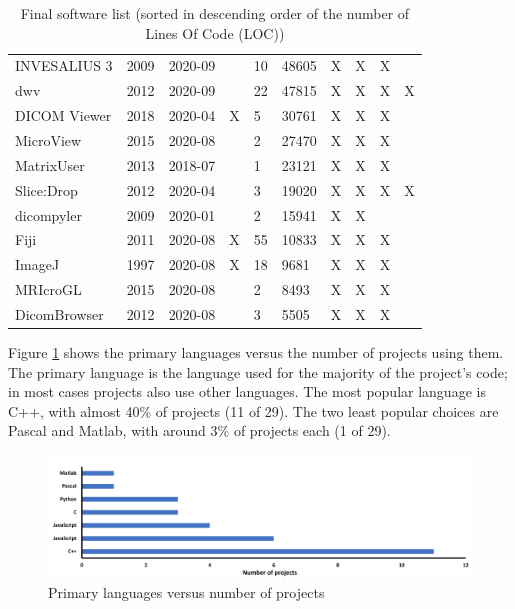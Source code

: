 \documentclass[final, 3p, times, authoryear]{elsarticle}
\begin{document}
\begin{table}[!ht]
\begin{tabular}{p{6cm}lllllllll}
INVESALIUS 3 \citep{Amorim2015} & 2009 & 2020-09 &  & 10 & 48605 & X & X & X &  \\
dwv \citep{Martelli2021} & 2012 & 2020-09 &  & 22 & 47815 & X & X & X & X \\
DICOM Viewer \citep{Afsar2021} & 2018 & 2020-04 & X & 5 & 30761 & X & X & X &  \\
MicroView \citep{ParallaxInnovations2020} & 2015 & 2020-08 &  & 2 & 27470 & X & X & X &  \\
MatrixUser \citep{Liu2016} & 2013 & 2018-07 &  & 1 & 23121 & X & X & X &  \\
Slice:Drop \citep{Haehn2013} & 2012 & 2020-04 &  & 3 & 19020 & X & X & X & X \\
dicompyler \citep{Panchal2010} & 2009 & 2020-01 &  & 2 & 15941 & X & X &  &  \\
Fiji \citep{Schindelin2012} & 2011 & 2020-08 & X & 55 & 10833 & X & X & X &  \\
ImageJ \citep{Rueden2017} & 1997 & 2020-08 & X & 18 & 9681 & X & X & X &  \\
MRIcroGL \citep{Rorden2021} & 2015 & 2020-08 &  & 2 & 8493 & X & X & X &  \\
DicomBrowser \citep{Archie2012} & 2012 & 2020-08 &  & 3 & 5505 & X & X & X &  \\ \bottomrule
\end{tabular}
\caption{Final software list (sorted in descending order of the number of Lines
Of Code (LOC))}
\label{tab_final_list}
\end{table}

Figure \ref{fig_language} shows the primary languages versus the number of
projects using them.  The primary language is the language used for the majority
of the project's code; in most cases projects also use other languages.  The
most popular language is C++, with almost 40\% of projects (11 of 29).  The two
least popular choices are Pascal and Matlab, with around 3\% of projects each
(1 of 29).

\begin{figure}[!ht]
\centering
\includegraphics[scale=0.5]{figures/PrimaryLanguages.pdf}
\centering
\caption{\label{fig_language}Primary languages versus number of projects}
\end{figure}
\end{document}

